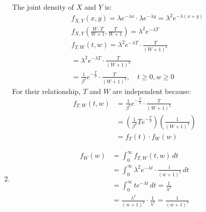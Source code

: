 \documentclass[12pt,letterpaper, onecolumn]{exam}
\begin{document}
\begin{questions}
\begin{solution}
\begin{enumerate}
        The joint density of $X$ and $Y$ is: 
        \begin{align*}
            & f_{X,Y}(x, y) = \lambda e^{-\lambda x} \cdot \lambda e^{-\lambda y} = \lambda^2 e^{-\lambda(x + y)} \\
            & f_{X,Y}\left( \frac{W \cdot T}{W + 1}, \frac{T}{W + 1} \right) = \lambda^2 e^{-\lambda T}\\
            & f_{T,W}(t, w) = \lambda^2 e^{-\lambda T} \cdot \frac{T}{(W + 1)^2}\\
            & = \lambda^2 e^{-\lambda T} \cdot \frac{T}{(W + 1)^2} \\
            & = \frac{1}{\beta^2} e^{-\frac{T}{\beta}} \cdot \frac{T}{(W + 1)^2}, \quad t \geq 0, w \geq 0
        \end{align*}
        For their relationship, $T$ and $W$ are independent because: 
        \begin{align*}
            f_{T,W}(t, w) & = \frac{1}{\beta^2} e^{-\frac{T}{\beta}} \cdot \frac{T}{(W + 1)^2} \\
            & = (\frac{1}{\beta^2}T e^{-\frac{T}{\beta}})(\frac{1}{(W+1)^2}) \\
            & = f_T(t) \cdot f_W(w)
        \end{align*}
        \item 
        \begin{align*}
            f_W(w) & = \int_0^\infty f_{T,W}(t, w) \, dt \\
            & = \int_0^\infty \lambda^2 e^{-\lambda t} \cdot \frac{t}{(w + 1)^2} \, dt \\
            & = \int_0^\infty t e^{-\lambda t} \, dt = \frac{1}{\lambda^2} \\
            & = \frac{\lambda^2}{(w + 1)^2} \cdot \frac{1}{\lambda^2} = \frac{1}{(w + 1)^2}
        \end{align*}

    \end{enumerate}
    \end{solution}
    
\end{questions}
\end{document}
